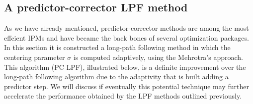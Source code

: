 \documentclass[a4paper,10 pt,titlepage,twoside]{report}
\theoremstyle{plain}
\theoremstyle{definition}
\theoremstyle{remark}
\begin{document}
{{\subsection{A predictor-corrector LPF method}
As we have already mentioned, predictor-corrector methods are among the most effcient IPMs and have became the back bones of several optimization packages.\\
In this section it is constructed a long-path following method in which the centering parameter $\sigma$ is computed adaptively, using the Mehrotra's approach.\\
This algorithm  (PC LPF), illustrated below, is a definite improvement over the long-path following algorithm due to the adaptivity that is built adding a predictor step. We will discuss if eventually this potential
technique may further accelerate the performance obtained by the LPF methods outlined previously.\\

}}
\end{document}
